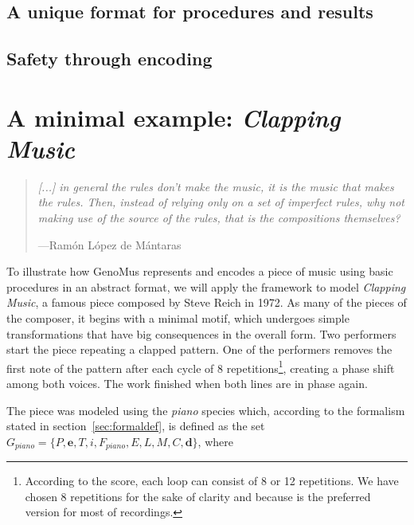 \documentclass{article}
\renewcommand{\vec}[1]{\mathbf{#1}}
\begin{document}
  
  
\subsection{A unique format for procedures and results}
\subsection{Safety through encoding}








\section{A minimal example: \textsl{Clapping Music}}

\begin{samepage}
\begin{quotation}
\textsl{[...] in general the rules don't make the music, it is the music that makes the rules. Then, instead of relying only on a set of imperfect rules, why not making use of the source of the rules, that is the compositions themselves?
}

---Ram\'{o}n L\'{o}pez de M\'{a}ntaras \cite{LopezdeMantaras:2006:MMA:1565082.1565089}
\end{quotation}
\end{samepage}






To illustrate how GenoMus represents and encodes a piece of music using basic procedures in an abstract format, we will apply the framework to model \emph{Clapping Music}, a famous piece composed by Steve Reich in 1972. As many of the pieces of the composer, it begins with a minimal motif, which undergoes simple transformations that have big consequences in the overall form. Two performers start the piece repeating a clapped pattern. One of the performers removes the first note of the pattern after each cycle of 8 repetitions\footnote{According to the score, each loop can consist of 8 or 12 repetitions. We have chosen 8 repetitions for the sake of clarity and because is the preferred version for most of recordings.}, creating a phase shift among both voices. The work finished when both lines are in phase again.

The piece was modeled using the \emph{piano} species which, according to the formalism stated in section~\ref{sec:formaldef}, is defined as the set $G_{piano} = \{P, \vec{e}, T, i, F_{piano}, E, L, M, C, \vec{d}\}$, where
\end{document}
